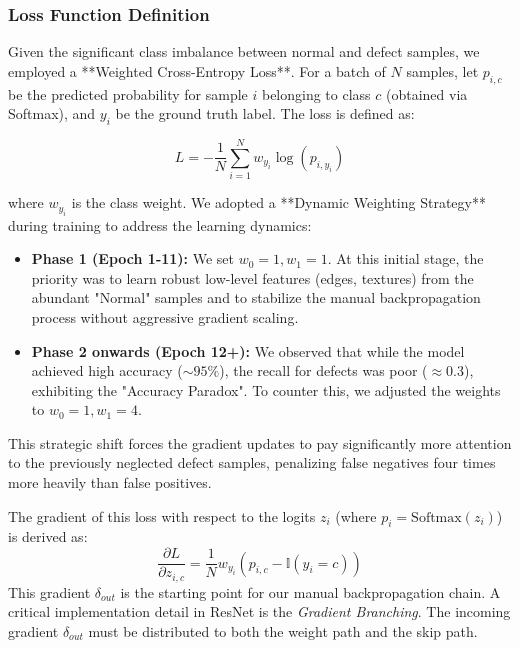 \subsubsection{Loss Function Definition}
Given the significant class imbalance between normal and defect samples, we employed a **Weighted Cross-Entropy Loss**.
For a batch of $N$ samples, let $p_{i,c}$ be the predicted probability for sample $i$ belonging to class $c$ (obtained via Softmax), and $y_i$ be the ground truth label. The loss is defined as:

\begin{equation}
    L = - \frac{1}{N} \sum_{i=1}^{N} w_{y_i} \log(p_{i, y_i})
\end{equation}

where $w_{y_i}$ is the class weight. We adopted a **Dynamic Weighting Strategy** during training to address the learning dynamics:
\begin{itemize}
    \item \textbf{Phase 1 (Epoch 1-11):} We set $w_0=1, w_1=1$. At this initial stage, the priority was to learn robust low-level features (edges, textures) from the abundant "Normal" samples and to stabilize the manual backpropagation process without aggressive gradient scaling.
    \item \textbf{Phase 2 onwards (Epoch 12+):} We observed that while the model achieved high accuracy ($\sim 95\%$), the recall for defects was poor ($\approx 0.3$), exhibiting the "Accuracy Paradox". To counter this, we adjusted the weights to $w_0=1, w_1=4$.
\end{itemize}
This strategic shift forces the gradient updates to pay significantly more attention to the previously neglected defect samples, penalizing false negatives four times more heavily than false positives.

The gradient of this loss with respect to the logits $z_i$ (where $p_i = \text{Softmax}(z_i)$) is derived as:
\begin{equation}
    \frac{\partial L}{\partial z_{i,c}} = \frac{1}{N} w_{y_i} (p_{i,c} - \mathbb{I}(y_i = c))
\end{equation}
This gradient $\delta_{out}$ is the starting point for our manual backpropagation chain.
A critical implementation detail in ResNet is the \textit{Gradient Branching}. The incoming gradient $\delta_{out}$ must be distributed to both the weight path and the skip path.

